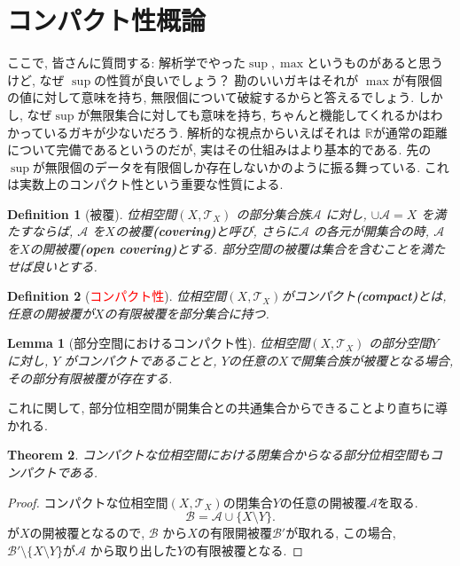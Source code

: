 \documentclass[dvipdfmx]{jbook}
\newtheorem{theorem}{Theorem}[section]
\newtheorem{lemma}[theorem]{Lemma}
\newtheorem{definition}{Definition}[section]
\theoremstyle{remark}
\theoremstyle{plain}
\begin{document}
\section{コンパクト性概論}

ここで, 皆さんに質問する: 解析学でやった$\sup , \max$というものがあると思うけど, なぜ $\sup$の性質が良いでしょう？
勘のいいガキはそれが $\max$が有限個の値に対して意味を持ち, 無限個について破綻するからと答えるでしょう.
しかし, なぜ$\sup$が無限集合に対しても意味を持ち, ちゃんと機能してくれるかはわかっているガキが少ないだろう.
解析的な視点からいえばそれは $\mathbb{R}$が通常の距離について完備であるというのだが, 実はその仕組みはより基本的である.
先の$\sup$が無限個のデータを有限個しか存在しないかのように振る舞っている. これは実数上のコンパクト性という重要な性質による.

\begin{definition}[被覆]
	位相空間$\left( X , \mathcal{T}_{X} \right)$ の部分集合族$\mathcal{A}$ に対し, $ \cup \mathcal{A} = X$ を満たすならば, $\mathcal{A}$ を$X$の被覆\textbf{(covering)}と呼び,  さらに$\mathcal{A}$ の各元が開集合の時, $\mathcal{A}$ を$X$の開被覆\textbf{(open covering)}とする. 部分空間の被覆は集合を含むことを満たせば良いとする.
\end{definition}

\begin{definition}[\textcolor{red}{コンパクト性}]
	位相空間$\left( X , \mathcal{T}_{X} \right)$がコンパクト\textbf{(compact)}とは, 任意の開被覆が$X$の有限被覆を部分集合に持つ.	
\end{definition}

\begin{lemma}[部分空間におけるコンパクト性]
	位相空間$\left( X , \mathcal{T}_{X} \right)$ の部分空間$Y$ に対し, 
	$Y$ がコンパクトであることと,  $Y$の任意の$X$で開集合族が被覆となる場合, その部分有限被覆が存在する.
\end{lemma}

これに関して, 部分位相空間が開集合との共通集合からできることより直ちに導かれる.

\begin{theorem}
	コンパクトな位相空間における閉集合からなる部分位相空間もコンパクトである.
\end{theorem}

\begin{proof}
	コンパクトな位相空間$\left( X , \mathcal{T}_{X} \right)$の閉集合$Y$の任意の開被覆$\mathcal{A}$を取る.
	\[
		\mathcal{B}= \mathcal{A} \cup \{X \setminus Y\}
	.\] 
	が$X$の開被覆となるので,  $\mathcal{B}$ から$X$の有限開被覆$\mathcal{B'}$が取れる, この場合, $\mathcal{B'} \setminus \{ X \setminus Y\}$が$\mathcal{A}$ から取り出した$Y$の有限被覆となる. 
\end{proof}
\end{document}
